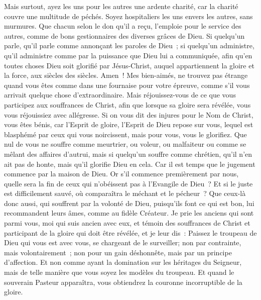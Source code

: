 \begin{multicols}{2}
Mais surtout, ayez les uns pour les autres une ardente charité, car la charité couvre une multitude de péchés.
Soyez hospitaliers les uns envers les autres, sans murmures. 
Que chacun selon le don qu'il a reçu, l'emploie pour le service des autres, comme de bons gestionnaires des diverses grâces de Dieu. 
Si quelqu'un parle, qu'il parle comme annonçant les paroles de Dieu~; si quelqu'un administre, qu'il administre comme par la puissance que Dieu lui a communiquée, afin qu'en toutes choses Dieu soit glorifié par Jésus-Christ, auquel appartiennent la gloire et la force, aux siècles des siècles. Amen~! 
Mes bien-aimés, ne trouvez pas étrange quand vous êtes comme dans une fournaise pour votre épreuve, comme s'il vous arrivait quelque chose d'extraordinaire. 
Mais réjouissez-vous de ce que vous participez aux souffrances de Christ, afin que lorsque sa gloire sera révélée, vous vous réjouissiez avec allégresse.
Si on vous dit des injures pour le Nom de Christ, vous êtes bénis, car l'Esprit de gloire, l'Esprit de Dieu repose sur vous, lequel est blasphémé par ceux qui vous noircissent, mais pour vous, vous le glorifiez.
Que nul de vous ne souffre comme meurtrier, ou voleur, ou malfaiteur ou comme se mêlant des affaires d'autrui,
mais si quelqu'un souffre comme chrétien, qu'il n'en ait pas de honte, mais qu'il glorifie Dieu en cela.
Car il est temps que le jugement commence par la maison de Dieu. Or s'il commence premièrement par nous, quelle sera la fin de ceux qui n'obéissent pas à l'Evangile de Dieu~?
Et si le juste est difficilement sauvé, où comparaîtra le méchant et le pécheur~? 
Que ceux-là donc aussi, qui souffrent par la volonté de Dieu, puisqu'ils font ce qui est bon, lui recommandent leurs âmes, comme au fidèle Créateur. 
\VerseOne{}Je prie les anciens qui sont parmi vous, moi qui suis ancien avec eux, et témoin des souffrances de Christ et participant de la gloire qui doit être révélée, et je leur dis~: 
Paissez le troupeau de Dieu qui vous est avec vous, se chargeant de le surveiller; non par contrainte, mais volontairement~; non pour un gain déshonnête, mais par un principe d'affection. 
Et non comme ayant la domination sur les héritages du Seigneur, mais de telle manière que vous soyez les modèles du troupeau. 
Et quand le souverain Pasteur apparaîtra, vous obtiendrez la couronne incorruptible de la gloire.

\end{multicols}
